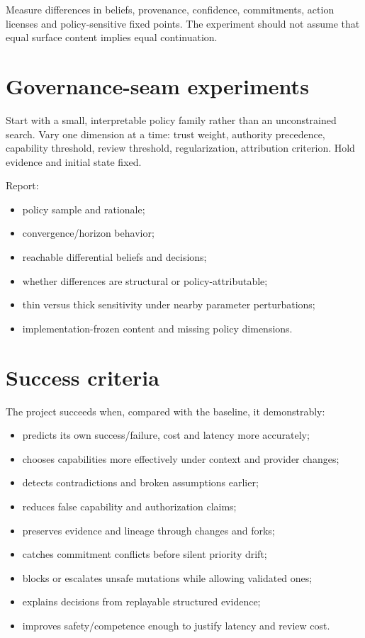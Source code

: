 \documentclass[11pt,oneside]{report}
\begin{document}
Measure differences in beliefs, provenance, confidence, commitments, action licenses and policy-sensitive fixed points. The experiment should not assume that equal surface content implies equal continuation.

\section{Governance-seam experiments}

Start with a small, interpretable policy family rather than an unconstrained search. Vary one dimension at a time: trust weight, authority precedence, capability threshold, review threshold, regularization, attribution criterion. Hold evidence and initial state fixed.

Report:

\begin{itemize}
  \item policy sample and rationale;
  \item convergence/horizon behavior;
  \item reachable differential beliefs and decisions;
  \item whether differences are structural or policy-attributable;
  \item thin versus thick sensitivity under nearby parameter perturbations;
  \item implementation-frozen content and missing policy dimensions.
\end{itemize}

\section{Success criteria}

The project succeeds when, compared with the baseline, it demonstrably:

\begin{itemize}
  \item predicts its own success/failure, cost and latency more accurately;
  \item chooses capabilities more effectively under context and provider changes;
  \item detects contradictions and broken assumptions earlier;
  \item reduces false capability and authorization claims;
  \item preserves evidence and lineage through changes and forks;
  \item catches commitment conflicts before silent priority drift;
  \item blocks or escalates unsafe mutations while allowing validated ones;
  \item explains decisions from replayable structured evidence;
  \item improves safety/competence enough to justify latency and review cost.
\end{itemize}
\end{document}
